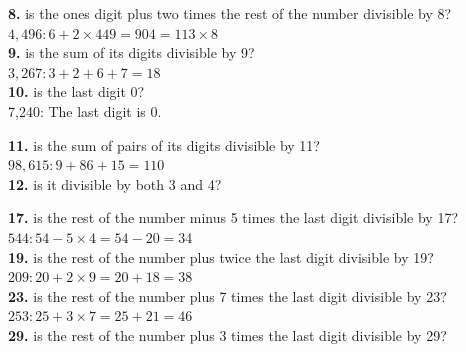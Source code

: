 \documentclass{article}
\begin{document}
\textbf{8.} is the ones digit plus two times the rest of the number divisible by 8?\\

\hspace{2ex}$4,496: 6 + 2 \times 449 = 904 = 113 \times 8$ \Checkmark\\

\textbf{9.} is the sum of its digits divisible by 9?\\

\hspace{2ex}$3,267: 3+2+6+7=18$ \Checkmark\\

\textbf{10.} is the last digit 0?\\

\hspace{2ex}7,240: The last digit is 0. \Checkmark\\

\newpage

\textbf{11.} is the sum of pairs of its digits divisible by 11?\\

\hspace{2ex}$98,615: 9 + 86 + 15 = 110$ \Checkmark\\

\textbf{12.} is it divisible by both 3 and 4?\\

\hspace{2ex}

\textbf{17.} is the rest of the number minus 5 times the last digit divisible by 17?\\

\hspace{2ex}$544: 54 - 5 \times 4 = 54 - 20 = 34$ \Checkmark\\

\textbf{19.} is the rest of the number plus twice the last digit divisible by 19?\\

\hspace{2ex}$209: 20 + 2 \times 9 = 20 + 18 = 38$ \Checkmark\\

\textbf{23.} is the rest of the number plus 7 times the last digit divisible by 23?\\

\hspace{2ex}$253: 25 + 3 \times 7 = 25 + 21 = 46$ \Checkmark\\

\textbf{29.} is the rest of the number plus 3 times the last digit divisible by 29?\\
\end{document}
